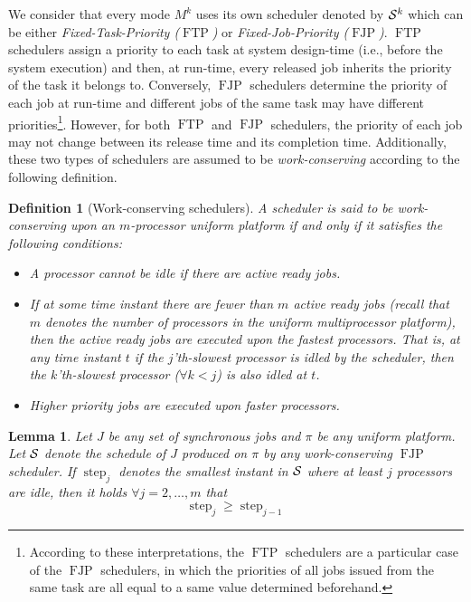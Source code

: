 \documentclass[10pt,english,a4paper]{article}
\newtheorem{lemma}{Lemma}
\newtheorem{definition}{\bf Definition}
\newtheorem{validity test}{Validity Test}
\newcommand{\FTP}{\operatorname{FTP}}
\newcommand{\FJP}{\operatorname{FJP}}
\newcommand{\minstep}{\operatorname{step}}
\begin{document}
We consider that every mode $M^k$ uses its own scheduler denoted by ${\cal S}^k$ which can be either {\em Fixed-Task-Priority ($\FTP$)} or {\em Fixed-Job-Priority ($\FJP$)}. $\FTP$ schedulers assign a priority to each task at system design-time (i.e., before the system execution) and then, at run-time, every released job inherits the priority of the task it belongs to. Conversely, $\FJP$ schedulers determine the priority of each job at run-time and different jobs of the same task may have different priorities\footnote{According to these interpretations, the $\FTP$ schedulers are a particular case of the $\FJP$ schedulers, in which the priorities of all jobs issued from the same task are all equal to a same value determined beforehand.}. However, for both $\FTP$ and $\FJP$ schedulers, the priority of each job may not change between its release time and its completion time. Additionally, these two types of schedulers are assumed to be \emph{work-conserving} according to the following definition.
 
\begin{definition}[Work-conserving schedulers]\label{wc_sched}
A scheduler is said to be work-conserving upon an $m$-processor uniform platform if and only if it satisfies the following conditions:
\begin{itemize}
\item A processor cannot be idle if there are active ready jobs.
\item If at some time instant there are fewer than $m$ active ready jobs (recall that $m$ denotes the number of processors in the uniform multiprocessor platform), then the active ready jobs are executed upon the fastest processors. That is, at any time instant $t$ if the $j$'th-slowest processor is idled by the scheduler, then the $k$'th-slowest processor ($\forall k < j$) is also idled at $t$. 
\item Higher priority jobs are executed upon faster processors.
\end{itemize}
\end{definition}

\begin{lemma}\label{lem:step}
Let $J$ be any set of synchronous jobs and $\pi$ be any uniform platform. Let ${\cal S}$ denote the schedule of $J$ produced on $\pi$ by any work-conserving $\FJP$ scheduler. If $\minstep_j$ denotes the smallest instant in ${\cal S}$ where at least $j$ processors are idle, then it holds $\forall j=2, \ldots, m$ that 
\begin{equation}\label{equ:step}
\minstep_j \geq \minstep_{j-1}
\end{equation}
\end{lemma}
\end{document}
